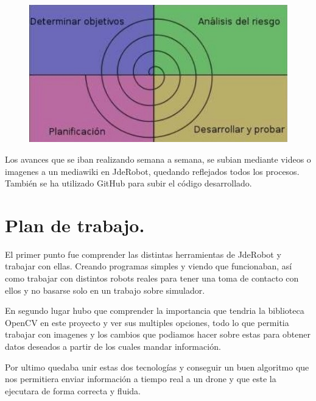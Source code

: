 \begin{figure}[H]
	\centering
		\includegraphics{imgs/metodologia-espiral.jpg}
	\label{fig:Desarrollo en espiral}
\end{figure}

\hspace{1 cm} Los avances que se iban realizando semana a semana, se subian mediante videos o imagenes a un mediawiki en JdeRobot, quedando reflejados todos los procesos. Tambi\'en se ha utilizado GitHub para subir el c\'odigo desarrollado.  

\section{Plan de trabajo.}
\hspace{1 cm} El primer punto fue comprender las distintas herramientas de JdeRobot y trabajar con ellas. Creando programas simples y viendo que funcionaban, as\'i como trabajar con distintos robots reales para tener una toma de contacto con ellos y no basarse solo en un trabajo sobre simulador. 

\hspace{1 cm} En segundo lugar hubo que comprender la importancia que tendria la biblioteca OpenCV en este proyecto y ver sus multiples opciones, todo lo que permitia trabajar con imagenes y los cambios que podiamos hacer sobre estas para obtener datos deseados a partir de los cuales mandar informaci\'on. 

\hspace{1 cm} Por ultimo quedaba unir estas dos tecnolog\'ias y conseguir un buen algoritmo que nos permitiera enviar informaci\'on a tiempo real a un drone y que este la ejecutara de forma correcta y fluida.  




